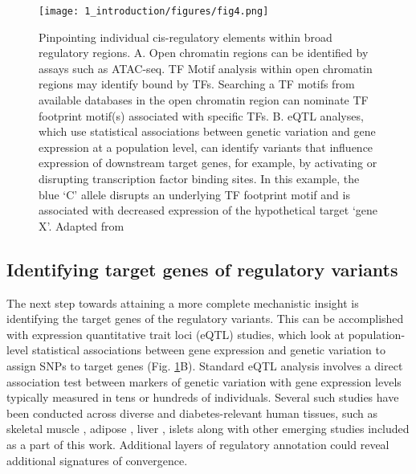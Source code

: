\begin{figure}
        \centering
        \texttt{[image: 1\_introduction/figures/fig4.png]}
        \caption{Pinpointing individual cis-regulatory elements within broad regulatory regions. A. Open chromatin regions can be identified by assays such as ATAC-seq. TF Motif analysis within open chromatin regions may identify bound by TFs. Searching a TF motifs from available databases in the open chromatin region can nominate TF footprint motif(s) associated with specific TFs. B. eQTL analyses, which use statistical associations between genetic variation and gene expression at a population level, can identify variants that influence expression of downstream target genes, for example, by activating or disrupting transcription factor binding sites. In this example, the blue ‘C’ allele disrupts an underlying TF footprint motif and is associated with decreased expression of the hypothetical target ‘gene X’. Adapted from \cite{kyonoGenomicAnnotationDiseaseassociated2019}}
        \label{fig:ci_f4}
\end{figure}


\subsection{Identifying target genes of regulatory variants}
The next step towards attaining a more complete mechanistic insight is identifying the target genes of the regulatory variants. This can be accomplished with expression quantitative trait loci (eQTL) studies, which look at population-level statistical associations between gene expression and genetic variation to assign SNPs to target genes (Fig. \ref{fig:ci_f4}B). Standard eQTL analysis involves a direct association test between markers of genetic variation with gene expression levels typically measured in tens or hundreds of individuals. Several such studies have been conducted across diverse and diabetes-relevant human tissues, such as skeletal muscle \cite{scottGeneticRegulatorySignature2016}, adipose \cite{civelekGeneticRegulationAdipose2017}, liver \cite{gtexconsortiumGeneticEffectsGene2017} , islets \cite{fadistaGlobalGenomicTranscriptomic2014, buntTranscriptExpressionData2015, varshneyGeneticRegulatorySignatures2017} along with other emerging studies included as a part of this work. Additional layers of regulatory annotation could reveal additional signatures of convergence.


